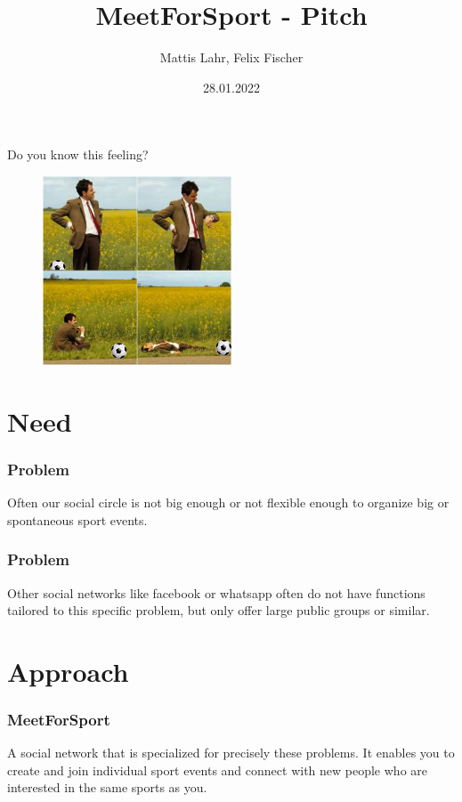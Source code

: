 \documentclass[aspectratio=169]{beamer}
\title{MeetForSport - Pitch}
\author{Mattis Lahr, Felix Fischer}
\date{28.01.2022}
\begin{document}
\maketitle



\begin{frame}
Do you know this feeling?
 \begin{figure}
		\centering
			\includegraphics[width=0.5\textwidth]{media/bean.jpg}
		\end{figure}
\end{frame}



\section{Need}
	\begin{frame}
		\frametitle{Problem}
		Often our social circle is not big enough or not flexible enough to organize big or spontaneous sport events.
	\end{frame}

	\begin{frame}
		\frametitle{Problem}
		Other social networks like facebook or whatsapp often do not have functions tailored to this specific problem, but only offer large public groups or similar. 
	\end{frame}

\section{Approach}

	\begin{frame}
		\frametitle{MeetForSport}
		A social network that is specialized for precisely these problems. It enables you to create and join individual sport events and connect with new people who are interested in the same sports as you.
	\end{frame}
\end{document}
